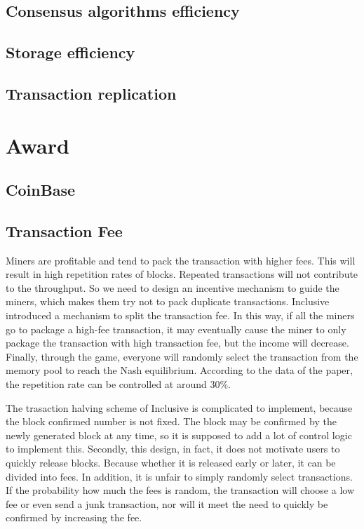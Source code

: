 \documentclass[a4paper,11pt]{article}
\begin{document}
\subsection{Consensus algorithms efficiency} 

\subsection{Storage efficiency} 

\subsection{Transaction replication} 

\section{Award}

\subsection{CoinBase}

\subsection{Transaction Fee}

Miners are profitable and tend to pack the transaction with higher fees. This will result in high repetition rates of blocks. Repeated transactions will not contribute to the throughput. So we need to design an incentive mechanism to guide the miners, which makes them try not to pack duplicate transactions. Inclusive introduced a mechanism to split the transaction fee. In this way, if all the miners go to package a high-fee transaction, it may eventually cause the miner to only package the transaction with high transaction fee, but the income will decrease. Finally, through the game, everyone will randomly select the transaction from the memory pool to reach the Nash equilibrium. According to the data of the paper, the repetition rate can be controlled at around 30\%.

The trasaction halving scheme of Inclusive is complicated to implement, because the block confirmed number is not fixed. The block may be confirmed by the newly generated block at any time, so it is supposed to add a lot of control logic to implement this. Secondly, this design, in fact, it does not motivate users to quickly release blocks. Because whether it is released early or later, it can be divided into fees. In addition, it is unfair to simply randomly select transactions. If the probability how much the fees is random, the transaction will choose a low fee or even send a junk transaction, nor will it meet the need to quickly be confirmed by increasing the fee.
\end{document}
